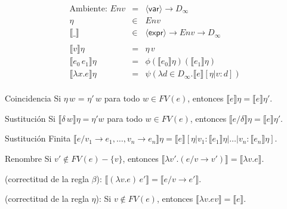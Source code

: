 \documentclass[12pt,a4paper]{article}
\newcommand{\nonterminal}[1]{\langle \mathsf{#1} \rangle}
\newcommand{\expr}{\nonterminal{expr}}
\newcommand{\var}{\nonterminal{var}}
\newcommand{\dinf}{D_\infty}
\newcommand{\Env}{\mathit{Env}}
\begin{document}
        \begin{eqnarray*}
          \text{Ambiente: } \Env &=& \var \to \dinf \\
          \eta &\in& \Env \\
          \llbracket\_\rrbracket &\in& \expr \to  Env \to  \dinf \\ \\
          \llbracket v\rrbracket\eta &=& \eta\, v \\
          \llbracket e_0\, e_1\rrbracket\eta &=& \phi(\llbracket e_0\rrbracket \eta) (\llbracket e_1\rrbracket\eta) \\
          \llbracket\lambda x.e\rrbracket\eta &=& \psi(\lambda d \in \dinf. \llbracket e\rrbracket[\eta |v:d]) \\
        \end{eqnarray*}        
        
    \begin{theorem}{Coincidencia} Si $\eta\, w$ = $\eta'\, w$ para todo $w \in FV(e)$,
      entonces $\llbracket e\rrbracket \eta = \llbracket e\rrbracket \eta'$.
    \end{theorem}
        
    \begin{theorem}{Sustitución} Si $\llbracket \delta\, w\rrbracket\eta = \eta' w$ para todo
      $w \in FV(e)$, entonces $\llbracket e/\delta\rrbracket \eta =\llbracket e\rrbracket\eta'$.
    \end{theorem}
    
    \begin{theorem}{Sustitución Finita} $\llbracket e/v_1\to e_1, \ldots,
      v_n\to e_n\rrbracket\eta = \llbracket e\rrbracket[\eta|v_1:
      \llbracket e_1\rrbracket\eta|\ldots|v_n:\llbracket e_n\rrbracket\eta]$.
    \end{theorem}
    
    \begin{theorem}{Renombre} Si $v' \not\in FV(e)-\{v\}$, entonces
      $\llbracket\lambda v'.(e/v\to v')\rrbracket = \llbracket\lambda
      v.e\rrbracket$.
    \end{theorem}
        
    \begin{property}(correctitud de la regla $\beta$): $\llbracket(\lambda v.e)\, e'\rrbracket = \llbracket e/v\to e'\rrbracket$.
    \end{property}
        
    \begin{property}
      (correctitud de la regla $\eta$): Si $v \not\in FV(e)$, entonces
      $\llbracket\lambda v.e v\rrbracket = \llbracket e\rrbracket$.
    \end{property}
        
\end{document}
